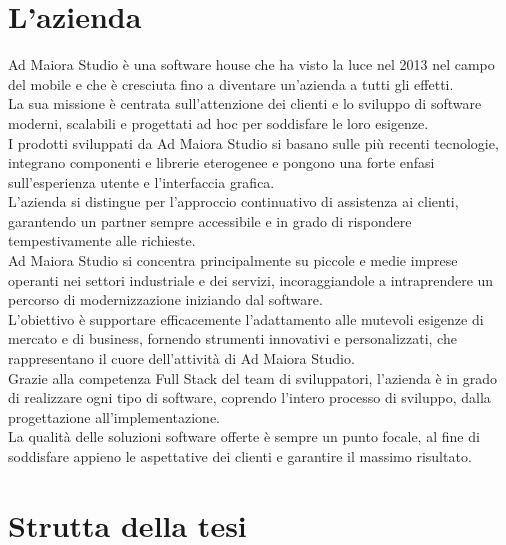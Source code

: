 \clearpage
\section{L'azienda}

Ad Maiora Studio è una software house che ha visto la luce nel 2013 nel campo del mobile e che è cresciuta fino a diventare un'azienda a tutti gli effetti.\\
La sua missione è centrata sull'attenzione dei clienti e lo sviluppo di software moderni, scalabili e progettati ad hoc per soddisfare le loro esigenze. \\
I prodotti sviluppati da Ad Maiora Studio si basano sulle più recenti tecnologie, integrano componenti e librerie eterogenee e pongono una forte enfasi sull'esperienza utente
 e l'interfaccia grafica.\\
L'azienda si distingue per l'approccio continuativo di assistenza ai clienti, garantendo un partner sempre accessibile e in grado di rispondere tempestivamente alle richieste. \\
Ad Maiora Studio si concentra principalmente su piccole e medie imprese operanti nei settori industriale e dei servizi, incoraggiandole a intraprendere un percorso di modernizzazione
 iniziando dal software.\\
  L'obiettivo è supportare efficacemente l'adattamento alle mutevoli esigenze di mercato e di business, fornendo strumenti innovativi e personalizzati, 
  che rappresentano il cuore dell'attività di Ad Maiora Studio.\\
Grazie alla competenza Full Stack del team di sviluppatori, l'azienda è in grado di realizzare ogni tipo di software, 
coprendo l'intero processo di sviluppo, dalla progettazione all'implementazione.\\
La qualità delle soluzioni software offerte è sempre un punto focale, al fine di soddisfare appieno le aspettative dei clienti e garantire il massimo risultato.

\section{Strutta della tesi}

